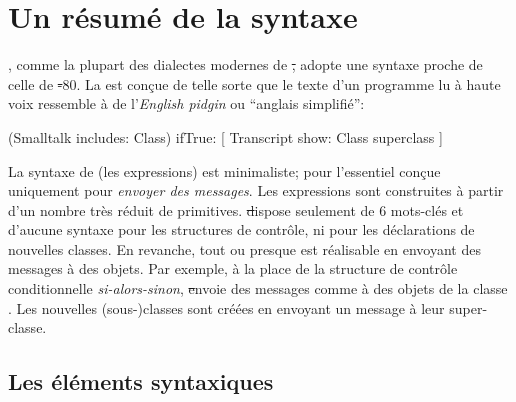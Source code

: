 \documentclass[a4paper,10pt,twoside]{book}
\begin{document}
	\renewcommand{\nnbb}[2]{} %
	\sloppy
\fi
\chapter{Un résumé de la syntaxe}



\pharo, comme la plupart des dialectes modernes de \st, adopte une syntaxe proche de celle de \st-80.
La  est conçue de telle sorte que le texte d'un
programme lu à haute voix ressemble à de l'\emph{English pidgin} ou ``anglais simplifié'':

\begin{code}{}
(Smalltalk includes: Class) ifTrue: [ Transcript show: Class superclass ]
\end{code}

\noindent
La syntaxe de \pharo (\ie les expressions) est minimaliste; pour l'essentiel conçue uniquement pour \emph{envoyer des messages}.
Les expressions sont construites à partir d'un nombre très réduit de primitives.
\st dispose seulement de 6 mots-clés et d'aucune syntaxe pour les structures de contrôle, ni pour les déclarations de nouvelles classes.
En revanche, tout ou presque est réalisable en envoyant des messages à des objets.
Par exemple, à la place de la structure de contrôle conditionnelle \emph{si-alors-sinon}, \st envoie des messages comme  à des objets de la classe .
Les nouvelles \mbox{(sous-)classes} sont créées en envoyant un message à leur super-classe.

\section{Les éléments syntaxiques }
\end{document}
